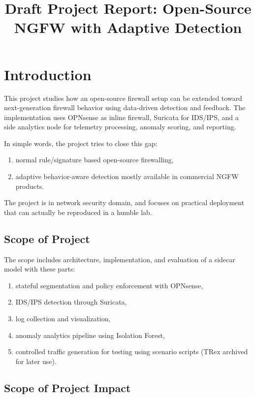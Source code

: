 \documentclass[12pt,a4paper]{article}
\title{Draft Project Report: Open-Source NGFW with Adaptive Detection}
\author{}
\date{}
\begin{document}
\maketitle

\section{Introduction}

This project studies how an open-source firewall setup can be extended toward next-generation firewall behavior using data-driven detection and feedback. The implementation uses OPNsense as inline firewall, Suricata for IDS/IPS, and a side analytics node for telemetry processing, anomaly scoring, and reporting.

In simple words, the project tries to close this gap:

\begin{enumerate}
    \item normal rule/signature based open-source firewalling,
    \item adaptive behavior-aware detection mostly available in commercial NGFW products.
\end{enumerate}

The project is in network security domain, and focuses on practical deployment that can actually be reproduced in a humble lab.

\subsection{Scope of Project}

The scope includes architecture, implementation, and evaluation of a sidecar model with these parts:

\begin{enumerate}
    \item stateful segmentation and policy enforcement with OPNsense,
    \item IDS/IPS detection through Suricata,
    \item log collection and visualization,
    \item anomaly analytics pipeline using Isolation Forest,
    \item controlled traffic generation for testing using scenario scripts (TRex archived for later use).
\end{enumerate}

\subsection{Scope of Project Impact}
\end{document}
